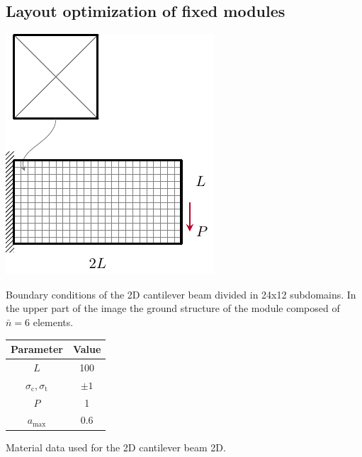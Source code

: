 \subsection{Layout optimization of fixed modules}
\begin{marginfigure}
    \centering
    \includegraphics[width=\linewidth]{figures/06_DMO/00_cantilever_bcs/cant_mesh.pdf}
    \caption{Boundary conditions of the 2D cantilever beam divided in 24x12 subdomains. In the upper part of the image the ground structure of the module composed of $\bar{n}=6$ elements.}
    \label{fig:06_cant_BC_GS}
\end{marginfigure}
\begin{margintable}
    \small
    \centering
    \begin{tabular}{cc}
    \toprule
    \textbf{Parameter}        & \textbf{Value} \\ \midrule
    $L$              & 100     \\
    $\sigma_\text{c}, \sigma_\text{t}$ & $\pm 1$\\
    $P$              & 1   \\
    $a_\text{max}$              & 0.6   \\
    \bottomrule
    \end{tabular}
    \caption{Material data used for the 2D cantilever beam 2D.}
    \label{tab:06_modular_cant_data}
\end{margintable}
